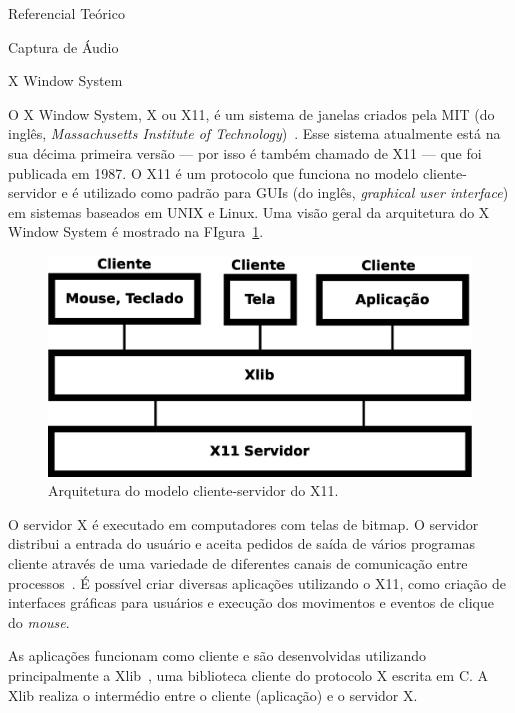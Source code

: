 \begin{chapter}{Referencial Teórico}
\begin{section}{Captura de Áudio}
\end{section}

\begin{section}{X Window System}

O X Window System, X ou X11, é um sistema de janelas criados pela MIT (do
inglês, \textit{Massachusetts Institute of Technology})~\cite{xlib}. Esse
sistema atualmente está na sua décima primeira versão --- por isso é também 
chamado de X11 --- que foi publicada em 1987. O X11 é um protocolo que funciona
no modelo cliente-servidor e é utilizado como padrão para GUIs (do inglês,
\textit{graphical user interface}) em sistemas baseados em UNIX e Linux. Uma
visão geral da arquitetura do X Window System é mostrado na
FIgura~\ref{fig:x11}.

\begin{figure}[!h]
	\centering
	\begin{minipage}[c]{\textwidth}
	\centering
	\includegraphics[width=0.7\linewidth]{fig/X11}
	\caption{Arquitetura do modelo cliente-servidor do X11.}
	\label{fig:x11}
	\end{minipage}
\end{figure} 

O servidor X é executado em computadores com telas de bitmap. O servidor
distribui a entrada do usuário e aceita pedidos de saída de vários programas
cliente através de uma variedade de diferentes canais de comunicação entre
processos~\cite{suse}. É possível criar diversas aplicações utilizando o X11,
como criação de interfaces gráficas para usuários e execução dos movimentos e
eventos de clique do \textit{mouse}. 

As aplicações funcionam como cliente e são desenvolvidas utilizando
principalmente a Xlib~\cite{xlib}, uma biblioteca cliente do protocolo X escrita
em C. A Xlib realiza o intermédio entre o cliente (aplicação) e o servidor X.  
\end{section}

\end{chapter}

